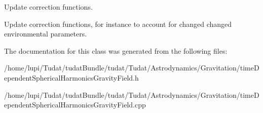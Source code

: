 Update correction functions. 

Update correction functions, for instance to account for changed changed environmental parameters. 

The documentation for this class was generated from the following files\+:\begin{DoxyCompactItemize}
\item 
/home/lupi/\+Tudat/tudat\+Bundle/tudat/\+Tudat/\+Astrodynamics/\+Gravitation/time\+Dependent\+Spherical\+Harmonics\+Gravity\+Field.\+h\item 
/home/lupi/\+Tudat/tudat\+Bundle/tudat/\+Tudat/\+Astrodynamics/\+Gravitation/time\+Dependent\+Spherical\+Harmonics\+Gravity\+Field.\+cpp\end{DoxyCompactItemize}
